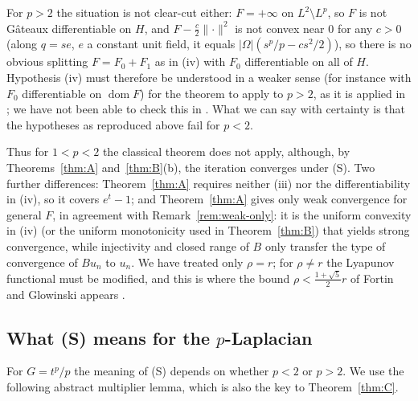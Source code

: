 \documentclass[11pt]{amsart}
\theoremstyle{definition}
\theoremstyle{remark}
\numberwithin{equation}{section}
\newcommand{\abs}[1]{\lvert #1\rvert}
\newcommand{\norm}[1]{\lVert #1\rVert}
\DeclareMathOperator{\dom}{dom}
\begin{document}
For $p>2$ the situation is not clear-cut either: $F=+\infty$ on $L^2\setminus L^p$, so $F$ is not G\^ateaux differentiable on $H$, and $F-\frac c2\norm\cdot^2$ is not convex near $0$ for any $c>0$ (along $q=se$, $e$ a constant unit field, it equals $\abs\Omega(s^p/p-cs^2/2)$), so there is no obvious splitting $F=F_0+F_1$ as in (iv) with $F_0$ differentiable on all of $H$. Hypothesis (iv) must therefore be understood in a weaker sense (for instance with $F_0$ differentiable on $\dom F$) for the theorem to apply to $p>2$, as it is applied in \cite{AragonFBRubio2023}; we have not been able to check this in \cite{Glowinski1984ChVI}. What we can say with certainty is that the hypotheses as reproduced above fail for $p<2$.

Thus for $1<p<2$ the classical theorem does not apply, although, by Theorems~\ref{thm:A} and~\ref{thm:B}(b), the iteration converges under (S). Two further differences: Theorem~\ref{thm:A} requires neither (iii) nor the differentiability in (iv), so it covers $e^t-1$; and Theorem~\ref{thm:A} gives only weak convergence for general $F$, in agreement with Remark~\ref{rem:weak-only}: it is the uniform convexity in (iv) (or the uniform monotonicity used in Theorem~\ref{thm:B}) that yields strong convergence, while injectivity and closed range of $B$ only transfer the type of convergence of $Bu_n$ to $u_n$. We have treated only $\rho=r$; for $\rho\ne r$ the Lyapunov functional must be modified, and this is where the bound $\rho<\frac{1+\sqrt5}2r$ of Fortin and Glowinski appears \cite{FortinGlowinski1983ChIII,GlowinskiPanTai2016}.

\subsection{\texorpdfstring{What (S) means for the $p$-Laplacian}{What (S) means for the p-Laplacian}}\label{ssec:S-p}
For $G=t^p/p$ the meaning of (S) depends on whether $p<2$ or $p>2$. We use the following abstract multiplier lemma, which is also the key to Theorem~\ref{thm:C}.
\end{document}
